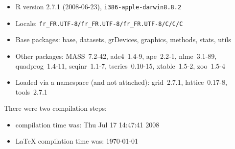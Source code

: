 \documentclass{article}
\begin{document}
\begin{itemize}
  \item R version 2.7.1 (2008-06-23), \verb|i386-apple-darwin8.8.2|
  \item Locale: \verb|fr_FR.UTF-8/fr_FR.UTF-8/fr_FR.UTF-8/C/C/C|
  \item Base packages: base, datasets, grDevices, graphics, methods,
    stats, utils
  \item Other packages: MASS~7.2-42, ade4~1.4-9, ape~2.2-1,
    nlme~3.1-89, quadprog~1.4-11, seqinr~1.1-7, tseries~0.10-15,
    xtable~1.5-2, zoo~1.5-4
  \item Loaded via a namespace (and not attached): grid~2.7.1,
    lattice~0.17-8, tools~2.7.1
\end{itemize}
There were two compilation steps:

\begin{itemize}
  \item \Rlogo{} compilation time was: Thu Jul 17 14:47:41 2008
  \item \LaTeX{} compilation time was: \today
\end{itemize}



\clearpage
{}


\end{document}
